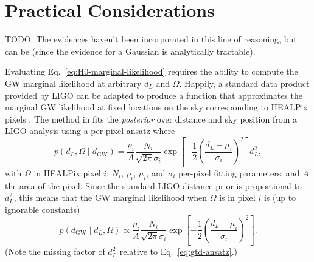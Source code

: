 \documentclass[modern]{aastex62}
\newcommand{\dGW}{d_{\mathrm{GW}}}
\begin{document}
\section{Practical Considerations}

TODO: The evidences haven't been incorporated in this line of reasoning, but can
be (since the evidence for a Gaussian is analytically tractable).

Evaluating Eq.\ \eqref{eq:H0-marginal-likelihood} requires the ability to
compute the \ac{GW} marginal likelihood at arbitrary $d_L$ and $\Omega$.
Happily, a standard data product provided by LIGO \citep{Singer2016} can be
adapted to produce a function that approximates the marginal \ac{GW} likelihood
at fixed locations on the sky corresponding to HEALPix pixels
\citep{Gorski2005}.  The method in \citet{Singer2016} fits the \emph{posterior}
over distance and sky position from a LIGO analysis using a per-pixel ansatz
where
%
\begin{equation}
    \label{eq:gtd-ansatz}
    p\left( d_L, \Omega \mid \dGW \right) = \frac{\rho_i}{A} \frac{N_i}{\sqrt{2\pi} \sigma_i} \exp\left[ -\frac{1}{2} \left(\frac{d_L-\mu_i}{\sigma_i}\right)^2 \right] d_L^2,
\end{equation}
%
with $\Omega$ in HEALPix pixel $i$; $N_i$, $\rho_i$, $\mu_i$, and $\sigma_i$
per-pixel fitting parameters; and $A$ the area of the pixel.  Since the standard
LIGO distance prior is proportional to $d_L^2$, this means that the \ac{GW}
marginal likelihood when $\Omega$ is in pixel $i$ is (up to ignorable constants)
%
\begin{equation}
    p\left( \dGW \mid d_L, \Omega \right) \propto \frac{\rho_i}{A} \frac{N_i}{\sqrt{2\pi} \sigma_i} \exp\left[ -\frac{1}{2} \left(\frac{d_L-\mu_i}{\sigma_i}\right)^2 \right].
\end{equation}
%
(Note the missing factor of $d_L^2$ relative to Eq.\ \eqref{eq:gtd-ansatz}.)
\end{document}
